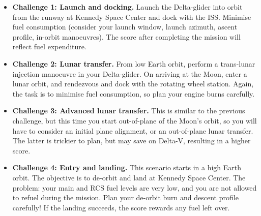 \documentclass[Orbiter User Manual.tex]{subfiles}
\begin{document}
\begin{itemize}
\item \textbf{Challenge 1: Launch and docking.} Launch the Delta-glider into orbit from the runway at Kennedy Space Center and dock with the ISS. Minimise fuel consumption (consider your launch window, launch azimuth, ascent profile, in-orbit manoeuvres). The score after completing the mission will reflect fuel expenditure.
\item \textbf{Challenge 2: Lunar transfer.} From low Earth orbit, perform a trans-lunar injection manoeuvre in your Delta-glider. On arriving at the Moon, enter a lunar orbit, and rendezvous and dock with the rotating wheel station. Again, the task is to minimise fuel consumption, so plan your engine burns carefully.
\item \textbf{Challenge 3: Advanced lunar transfer.} This is similar to the previous challenge, but this time you start out-of-plane of the Moon's orbit, so you will have to consider an initial plane alignment, or an out-of-plane lunar transfer. The latter is trickier to plan, but may save on Delta-V, resulting in a higher score.
\item \textbf{Challenge 4: Entry and landing.} This scenario starts in a high Earth orbit. The objective is to de-orbit and land at Kennedy Space Center. The problem: your main and RCS fuel levels are very low, and you are not allowed to refuel during the mission. Plan your de-orbit burn and descent profile carefully! If the landing succeeds, the score rewards any fuel left over.
\end{itemize}
\end{document}
